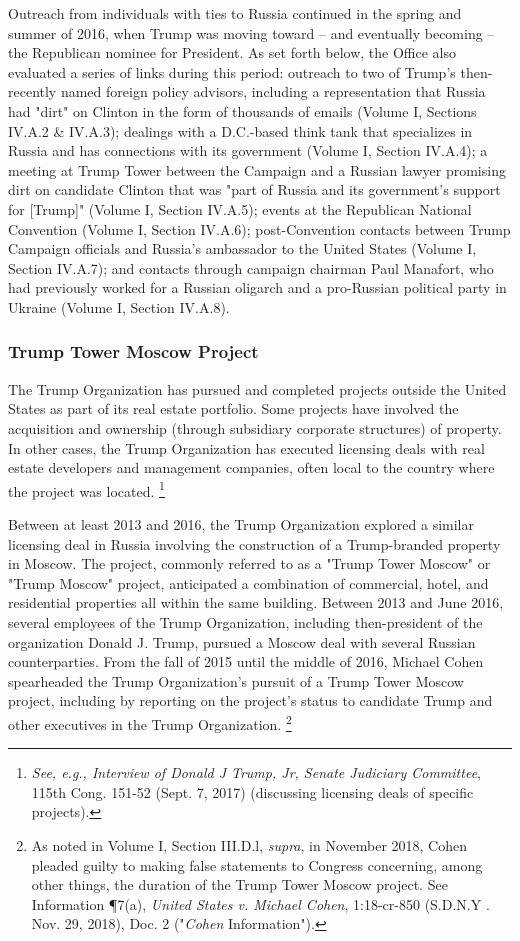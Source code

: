 Outreach from individuals with ties to Russia continued in the spring and summer of 2016, when Trump was moving toward -- and eventually becoming -- the Republican nominee for President.
As set forth below, the Office also evaluated a series of links during this period: outreach to two of Trump's then-recently named foreign policy advisors, including a representation that Russia had "dirt" on Clinton in the form of thousands of emails (Volume I, Sections IV.A.2 \& IV.A.3);
dealings with a D.C.-based think tank that specializes in Russia and has connections with its government (Volume I, Section IV.A.4);
a meeting at Trump Tower between the Campaign and a Russian lawyer promising dirt on candidate Clinton that was "part of Russia and its government's support for [Trump]" (Volume I, Section IV.A.5);
events at the Republican National Convention (Volume I, Section IV.A.6);
post-Convention contacts between Trump Campaign officials and Russia's ambassador to the United States (Volume I, Section IV.A.7);
and contacts through campaign chairman Paul Manafort, who had previously worked for a Russian oligarch and a pro-Russian political party in Ukraine (Volume I, Section IV.A.8).

\subsubsection{Trump Tower Moscow Project}

The Trump Organization has pursued and completed projects outside the United States as part of its real estate portfolio.
Some projects have involved the acquisition and ownership (through subsidiary corporate structures) of property.
In other cases, the Trump Organization has executed licensing deals with real estate developers and management companies, often local to the country where the project was located.%
\footnote{\textit{See, e.g., Interview of Donald J Trump, Jr, Senate Judiciary Committee}, 115th Cong. 151-52 (Sept. 7, 2017) (discussing licensing deals of specific projects).}

Between at least 2013 and 2016, the Trump Organization explored a similar licensing deal in Russia involving the construction of a Trump-branded property in Moscow.
The project, commonly referred to as a "Trump Tower Moscow" or "Trump Moscow" project, anticipated a combination of commercial, hotel, and residential properties all within the same building.
Between 2013 and June 2016, several employees of the Trump Organization, including then-president of the organization Donald J. Trump, pursued a Moscow deal with several Russian counterparties.
From the fall of 2015 until the middle of 2016, Michael Cohen spearheaded the Trump Organization's pursuit of a Trump Tower Moscow project, including by reporting on the project's status to candidate Trump and other executives in the Trump Organization.%
\footnote{As noted in Volume I, Section III.D.l, \textit{supra}, in November 2018, Cohen pleaded guilty to making false statements to Congress concerning, among other things, the duration of the Trump Tower Moscow project.
See Information \P 7(a), \textit{United States v. Michael Cohen}, 1:18-cr-850 (S.D.N.Y . Nov. 29, 2018), Doc. 2 ("\textit{Cohen} Information").}

